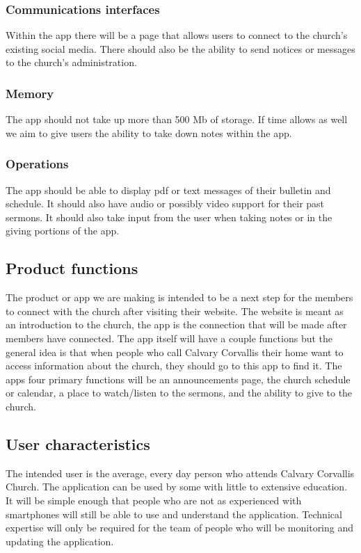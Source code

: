 \documentclass[letterpaper,10pt,draftclsnofoot,onecolumn,compsoc,titlepage]{IEEEtran}
\begin{document}
	\subsubsection{Communications interfaces}
	Within the app there will be a page that allows users to connect to the church's existing social media.
	There should also be the ability to send notices or messages to the church's administration.

	\subsubsection{Memory}
	The app should not take up more than 500 Mb of storage.
	If time allows as well we aim to give users the ability to take down notes within the app.

	\subsubsection{Operations}
	The app should be able to display pdf or text messages of their bulletin and schedule.
	It should also have audio or possibly video support for their past sermons.
	It should also take input from the user when taking notes or in the giving portions of the app.

	\subsection{Product functions}
	The product or app we are making is intended to be a next step for the members to connect with the church after visiting their website.
	The website is meant as an introduction to the church, the app is the connection that will be made after members have connected.
	The app itself will have a couple functions but the general idea is that when people who call Calvary Corvallis their home want to access information about the church, they should go to this app to find it.
	The apps four primary functions will be an announcements page, the church schedule or calendar, a place to watch/listen to the sermons, and the ability to give to the church.

	\subsection{User characteristics}
	The intended user is the average, every day person who attends Calvary Corvallis Church.
	The application can be used by some with little to extensive education.
	It will be simple enough that people who are not as experienced with smartphones will still be able to use and understand the application.
	Technical expertise will only be required for the team of people who will be monitoring and updating the application.
\end{document}
